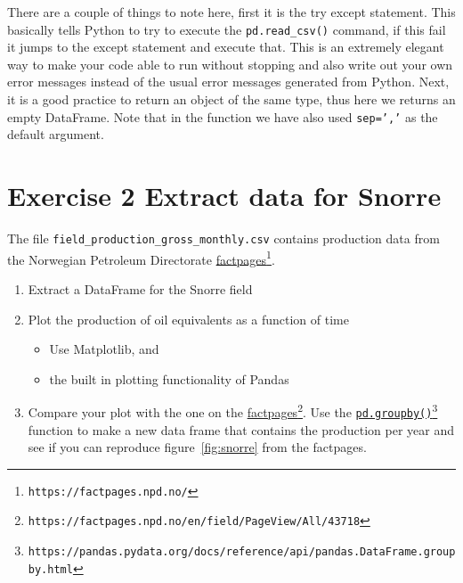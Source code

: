 \documentclass[%
twoside,                 %
final,                   %
10pt]{article}
\begin{document}
There are a couple of things to note here, first it is the try except statement. This basically tells Python to try to execute the \Verb!pd.read_csv()! command, if this fail it jumps to the except statement and execute that. This is an extremely elegant way to make your code able to run without stopping and also write out your own error messages instead of the usual error messages generated from Python. Next, it is a good practice to return an object of the same type, thus here we returns an empty DataFrame. Note that in the function we have also used \texttt{sep=','} as the default argument. 

\section{Exercise 2 Extract data for Snorre}
The file \Verb!field_production_gross_monthly.csv! contains production data from the Norwegian Petroleum Directorate \href{{https://factpages.npd.no/}}{factpages}\footnote{\texttt{https://factpages.npd.no/}}.

\begin{enumerate}
\item Extract a DataFrame for the Snorre field

\item Plot the production of oil equivalents as a function of time
\begin{itemize}

  \item Use Matplotlib, and

  \item the built in plotting functionality of Pandas

\end{itemize}

\noindent
\item Compare your plot with the one on the \href{{https://factpages.npd.no/en/field/PageView/All/43718}}{factpages}\footnote{\texttt{https://factpages.npd.no/en/field/PageView/All/43718}}. Use the \href{{https://pandas.pydata.org/docs/reference/api/pandas.DataFrame.groupby.html}}{\nolinkurl{pd.groupby()}\footnote{\texttt{https://pandas.pydata.org/docs/reference/api/pandas.DataFrame.groupby.html}}} function to make a new data frame that contains the production per year and see if you can reproduce figure~\ref{fig:snorre} from the factpages.
\end{enumerate}
\end{document}
